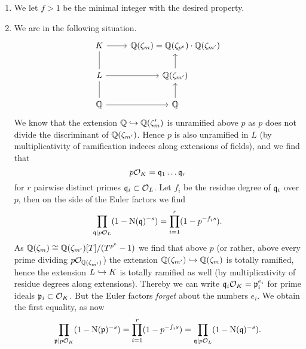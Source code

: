 \documentclass[a4paper,11pt]{article}
\begin{document}
\begin{enumerate}[wide, labelindent=0pt]
    \item We let $f>1$ be the minimal integer with the desired property. 
    \item We are in the following situation.
\[      \begin{tikzcd}[ampersand replacement=\&]
	    K \& {\Q(\zeta_m) = \Q(\zeta_{p^e}) \cdot \Q(\zeta_{m'})} \\
	    L \& {\Q(\zeta_{m'})} \\
	    \Q \& \Q
	    \arrow[from=2-2, to=1-2]
	    \arrow[no head, from=2-1, to=1-1]
	    \arrow[no head, from=3-1, to=2-1]
	    \arrow[from=1-1, to=1-2]
	    \arrow[from=2-1, to=2-2]
	    \arrow[from=3-1, to=3-2]
	    \arrow[from=3-2, to=2-2]
    \end{tikzcd}
\]
        We know that the extension $\mathbb{Q} \hookrightarrow \mathbb{Q}(\zeta_m')$ is unramified above $p$
        as $p$ does not divide the discriminant of $\mathbb{Q}(\zeta_{m'})$. Hence $p$ is also 
        unramified in $L$ (by multiplicativity of ramification indeces along 
        extensions of fields), and we find that 
        \begin{equation*}
            p\mathcal{O}_K = \mathfrak{q}_1 \dots \mathfrak{q}_r
        \end{equation*}
        for $r$ pairwise distinct primes $\mathfrak{q}_i \subset \mathcal{O}_L$. Let $f_i$ be the
        residue degree of $\mathfrak{q}_i$ over $p$, then on the side of the Euler factors
        we find
        \begin{equation*}
            \prod_{\mathfrak{q} \mid p\mathcal{O}_L}(1 - \operatorname{N}(\mathfrak{q})^{-s}) = 
            \prod_{i=1}^r(1 - p^{-f_is}).
        \end{equation*}
        As $\mathbb{Q}(\zeta_m) \cong \mathbb{Q}(\zeta_{m'})[T]/(T^{p^e}-1)$ we find that above $p$
        (or rather, above every prime dividing $p\mathcal{O}_{\mathbb{Q}(\zeta_{m'})}$)
        the extension $\mathbb{Q}(\zeta_{m'}) \hookrightarrow \mathbb{Q}(\zeta_m)$ is totally ramified, hence
        the extension $L \hookrightarrow K$ is totally ramified as well (by multiplicativity of 
        residue degrees along extensions). Thereby we can write 
        $\mathfrak{q}_i \mathcal{O}_K = \mathfrak{p}_i^{e_i}$ for prime ideals $\mathfrak{p}_i \subset \mathcal{O}_K$. But the 
        Euler factors \emph{forget} about the numbers $e_i$. We obtain the first equality,
        as now
        \begin{equation*}
            \prod_{\mathfrak{p} \mid p\mathcal{O}_K}(1 - \operatorname{N}(\mathfrak{p})^{-s}) = 
            \prod_{i=1}^r(1 - p^{-f_is}) = 
            \prod_{\mathfrak{q} \mid p\mathcal{O}_L}(1 - \operatorname{N}(\mathfrak{q})^{-s}).
        \end{equation*}


\end{enumerate}
\end{document}
